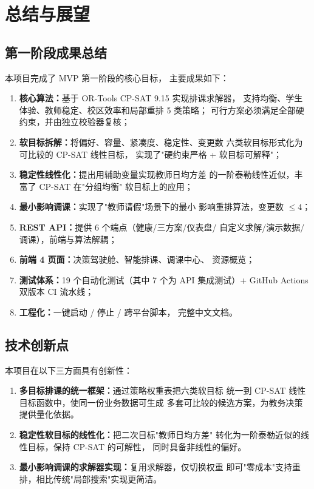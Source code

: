 ﻿%
\section{总结与展望}

\subsection{第一阶段成果总结}

本项目完成了 MVP 第一阶段的核心目标，
主要成果如下：

\begin{enumerate}[leftmargin=2em,itemsep=0.2em]
\item \textbf{核心算法：}基于 OR-Tools CP-SAT 9.15 实现排课求解器，
  支持均衡、学生体验、教师稳定、校区效率和局部重排 5 类策略；
  可行方案必须满足全部硬约束，并由独立校验器复核；
\item \textbf{软目标拆解：}将偏好、容量、紧凑度、稳定性、变更数
  六类软目标形式化为可比较的 CP-SAT 线性目标，
  实现了"硬约束严格 + 软目标可解释"；
\item \textbf{稳定性线性化：}提出用辅助变量实现教师日均方差
  的一阶泰勒线性近似，丰富了 CP-SAT 在"分组均衡"
  软目标上的应用；
\item \textbf{最小影响调课：}实现了"教师请假"场景下的最小
  影响重排算法，变更数 $\le 4$；
\item \textbf{REST API：}提供 6 个端点（健康/三方案/仪表盘/
  自定义求解/演示数据/调课），前端与算法解耦；
\item \textbf{前端 4 页面：}决策驾驶舱、智能排课、调课中心、
  资源概览；
\item \textbf{测试体系：}19 个自动化测试（其中 7 个为 API 集成测试）+
  GitHub Actions 双版本 CI 流水线；
\item \textbf{工程化：}一键启动 / 停止 / 跨平台脚本，
  完整中文文档。
\end{enumerate}

\subsection{技术创新点}

本项目在以下三方面具有创新性：

\begin{enumerate}[leftmargin=2em,itemsep=0.2em]
\item \textbf{多目标排课的统一框架：}通过策略权重表把六类软目标
  统一到 CP-SAT 线性目标函数中，使同一份业务数据可生成
  多套可比较的候选方案，为教务决策提供量化依据。
\item \textbf{稳定性软目标的线性化：}把二次目标"教师日均方差"
  转化为一阶泰勒近似的线性目标，保持 CP-SAT 的可解性，
  同时具备非线性的偏好。
\item \textbf{最小影响调课的求解器实现：}复用求解器，仅切换权重
  即可"零成本"支持重排，相比传统"局部搜索"实现更简洁。
\end{enumerate}

